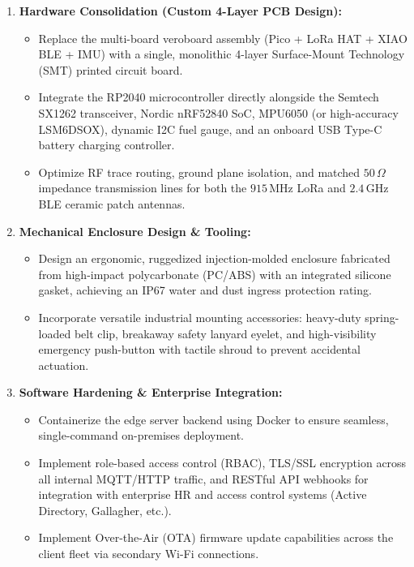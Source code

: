 \begin{enumerate}
    \item \textbf{Hardware Consolidation (Custom 4-Layer PCB Design):}
    \begin{itemize}
        \item Replace the multi-board veroboard assembly (Pico + LoRa HAT + XIAO BLE + IMU) with a single, monolithic 4-layer Surface-Mount Technology (SMT) printed circuit board.
        \item Integrate the RP2040 microcontroller directly alongside the Semtech SX1262 transceiver, Nordic nRF52840 SoC, MPU6050 (or high-accuracy LSM6DSOX), dynamic I2C fuel gauge, and an onboard USB Type-C battery charging controller.
        \item Optimize RF trace routing, ground plane isolation, and matched $50\,\Omega$ impedance transmission lines for both the $915\,\text{MHz}$ LoRa and $2.4\,\text{GHz}$ BLE ceramic patch antennas.
    \end{itemize}

    \item \textbf{Mechanical Enclosure Design \& Tooling:}
    \begin{itemize}
        \item Design an ergonomic, ruggedized injection-molded enclosure fabricated from high-impact polycarbonate (PC/ABS) with an integrated silicone gasket, achieving an IP67 water and dust ingress protection rating.
        \item Incorporate versatile industrial mounting accessories: heavy-duty spring-loaded belt clip, breakaway safety lanyard eyelet, and high-visibility emergency push-button with tactile shroud to prevent accidental actuation.
    \end{itemize}

    \item \textbf{Software Hardening \& Enterprise Integration:}
    \begin{itemize}
        \item Containerize the edge server backend using Docker to ensure seamless, single-command on-premises deployment.
        \item Implement role-based access control (RBAC), TLS/SSL encryption across all internal MQTT/HTTP traffic, and RESTful API webhooks for integration with enterprise HR and access control systems (Active Directory, Gallagher, etc.).
        \item Implement Over-the-Air (OTA) firmware update capabilities across the client fleet via secondary Wi-Fi connections.
    \end{itemize}


\end{enumerate}
